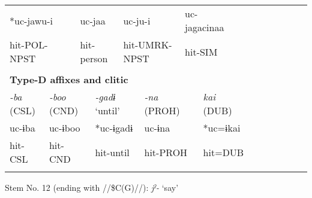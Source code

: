 \begin{tabularx}{\textwidth}{XXm{}XXXXXXXXXXXXXXXXXXXX}
\multicolumn{4}{X}{{ *uc-jawu-i}} & \multicolumn{3}{X}{uc-jaa} & \multicolumn{5}{X}{uc-ju-i} & \multicolumn{4}{X}{{ uc-jagacinaa}} & \multicolumn{7}{X}{}\\
\multicolumn{4}{X}{hit-POL-NPST} & \multicolumn{3}{X}{hit-person} & \multicolumn{5}{X}{hit-UMRK-NPST} & \multicolumn{4}{X}{hit-SIM} & \multicolumn{7}{X}{}\\
\multicolumn{23}{X}{}\\
\multicolumn{23}{X}{{\bfseries Type-D affixes and clitic}}\\
{ \textit{{}-ba} (CSL)} & \multicolumn{4}{X}{{ \textit{{}-boo} (CND)}} & \multicolumn{4}{X}{{ \textit{{}-gadɨ} ‘until’}} & \multicolumn{4}{X}{{ \textit{{}-na} (PROH)}} & \multicolumn{4}{X}{{ \textit{kai} (DUB)}} & \multicolumn{6}{X}{}\\
{ uc-ɨba} & \multicolumn{4}{X}{{ uc-ɨboo}} & \multicolumn{4}{X}{{ *uc-ɨgadɨ}} & \multicolumn{4}{X}{{ uc-ɨna}} & \multicolumn{4}{X}{{ *uc=ɨkai}} & \multicolumn{6}{X}{}\\
hit-CSL & \multicolumn{4}{X}{hit-CND} & \multicolumn{4}{X}{hit-until} & \multicolumn{4}{X}{hit-PROH} & \multicolumn{4}{X}{hit=DUB} & \multicolumn{6}{X}{}\\
\lspbottomrule
\end{tabularx}
Stem No. 12 (ending with //\$C(G)//): \textit{jˀ-} ‘say’

\tablefirsthead{}

